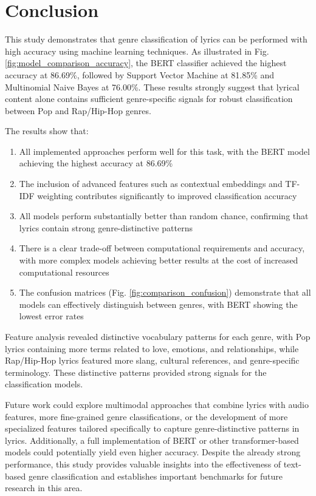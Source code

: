 \documentclass[conference]{IEEEtran}
\begin{document}
\section{Conclusion}
This study demonstrates that genre classification of lyrics can be performed with high accuracy using machine learning techniques. As illustrated in Fig. \ref{fig:model_comparison_accuracy}, the BERT classifier achieved the highest accuracy at 86.69\%, followed by Support Vector Machine at 81.85\% and Multinomial Naive Bayes at 76.00\%. These results strongly suggest that lyrical content alone contains sufficient genre-specific signals for robust classification between Pop and Rap/Hip-Hop genres.

The results show that:
\begin{enumerate}
\item All implemented approaches perform well for this task, with the BERT model achieving the highest accuracy at 86.69\%
\item The inclusion of advanced features such as contextual embeddings and TF-IDF weighting contributes significantly to improved classification accuracy
\item All models perform substantially better than random chance, confirming that lyrics contain strong genre-distinctive patterns
\item There is a clear trade-off between computational requirements and accuracy, with more complex models achieving better results at the cost of increased computational resources
\item The confusion matrices (Fig. \ref{fig:comparison_confusion}) demonstrate that all models can effectively distinguish between genres, with BERT showing the lowest error rates
\end{enumerate}

Feature analysis revealed distinctive vocabulary patterns for each genre, with Pop lyrics containing more terms related to love, emotions, and relationships, while Rap/Hip-Hop lyrics featured more slang, cultural references, and genre-specific terminology. These distinctive patterns provided strong signals for the classification models.

Future work could explore multimodal approaches that combine lyrics with audio features, more fine-grained genre classifications, or the development of more specialized features tailored specifically to capture genre-distinctive patterns in lyrics. Additionally, a full implementation of BERT or other transformer-based models could potentially yield even higher accuracy. Despite the already strong performance, this study provides valuable insights into the effectiveness of text-based genre classification and establishes important benchmarks for future research in this area.
\end{document}
